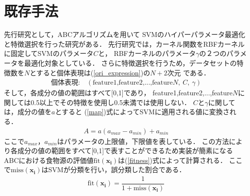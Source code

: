 \section{既存手法}
先行研究として，ABCアルゴリズムを用いて
SVMのハイパーパラメータ最適化と特徴選択を行った研究がある\cite{origin}．
先行研究では，カーネル関数をRBFカーネルに固定してSVMのパラメータ$C$と，
RBFカーネルのパラメータ$\gamma$の２つのパラメータを最適化対象としている．
さらに特徴選択を行うため，データセットの特徴数を$N$とすると個体表現は(\ref{ori_expression})の$N+2$次元
である．
\begin{align}
  \text{個体表現:} \quad  (\text{feature1,feature2,...,feature}N,~C,~\gamma)\label{ori_expression}
\end{align}
そして，各成分の値の範囲はすべて[0,1]であり，
feature1,feature2,...,feature$N$に関しては0.5以上でその特徴を使用し0.5未満では使用しない．
$C$と$\gamma$に関しては，成分の値を$a$とすると
(\ref{map})式によってSVMに適用される値に変換される．
\begin{align}
  \label{map}
  A =a(a_{max} -a_{min}) + a_{min}
\end{align}
ここで$a_{max}$，$a_{min}$はパラメータの上限値，下限値を表している．
この方法により各成分の値の範囲をすべて[0,1]で表すことができるため実装が簡素になる
ABCにおける食物源の評価値$\mathrm{fit}(\boldsymbol{x_{i}})$は(\ref{fitness})式によって計算される．
ここで$\mathrm{miss}(\boldsymbol{x_{i}})$はSVMが分類を行い，誤分類した割合である．
\begin{align}
    \label{fitness}
    \mathrm{fit}(\boldsymbol{x_{i}}) = \dfrac{1}{1+ \mathrm{miss}(\boldsymbol{x_{i}})}
\end{align}